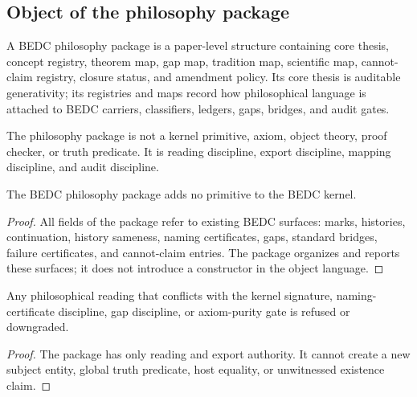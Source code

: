 \subsection{Object of the philosophy package}
\label{subsec:philosophy-package-object}

\begin{definition}
\label{def:philosophy-bedc-package}
A BEDC philosophy package is a paper-level structure containing core
thesis, concept registry, theorem map, gap map, tradition map,
scientific map, cannot-claim registry, closure status, and amendment
policy. Its core thesis is auditable generativity; its registries and
maps record how philosophical language is attached to BEDC carriers,
classifiers, ledgers, gaps, bridges, and audit gates.
\end{definition}

\begin{definition}
\label{def:philosophy-package-not-kernel-extension}
The philosophy package is not a kernel primitive, axiom, object theory,
proof checker, or truth predicate. It is reading discipline, export
discipline, mapping discipline, and audit discipline.
\end{definition}

\begin{theorem}
\label{thm:philosophy-package-adds-no-primitive}
The BEDC philosophy package adds no primitive to the BEDC kernel.
\end{theorem}
\begin{proof}
All fields of the package refer to existing BEDC surfaces: marks,
histories, continuation, history sameness, naming certificates, gaps,
standard bridges, failure certificates, and cannot-claim entries. The
package organizes and reports these surfaces; it does not introduce a
constructor in the object language.
\end{proof}

\begin{corollary}
\label{cor:philosophy-cannot-overrule-kernel}
Any philosophical reading that conflicts with the kernel signature,
naming-certificate discipline, gap discipline, or axiom-purity gate is
refused or downgraded.
\end{corollary}
\begin{proof}
The package has only reading and export authority. It cannot create a
new subject entity, global truth predicate, host equality, or
unwitnessed existence claim.
\end{proof}

